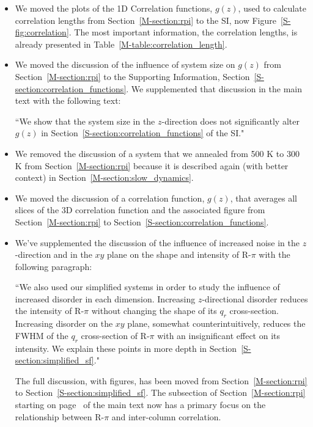 \documentclass{article}
\begin{document}
\begin{enumerate}
\begin{itemize}
    \item We moved the plots of the 1D Correlation functions, $g(z)$, used to calculate 
    correlation lengths from Section~\ref{M-section:rpi} to the SI, now Figure~\ref{S-fig:correlation}.
    The most important information, the correlation lengths, is already presented in 
    Table~\ref{M-table:correlation_length}.
    
    \item We moved the discussion of the influence of system size on $g(z)$ 
    from Section~\ref{M-section:rpi} to the Supporting Information, 
    Section~\ref{S-section:correlation_functions}. We supplemented that discussion in
    the main text with the following text:    
    
    ``We show that the system size in the $z$-direction does not significantly 
    alter $g(z)$ in Section~\ref{S-section:correlation_functions} of the SI."
    
    \item We removed the discussion of a system that we annealed from 500 K to 300 K
    from Section~\ref{M-section:rpi} because it is described again (with better context)
    in Section~\ref{M-section:slow_dynamics}.
    
	\item We moved the discussion of a correlation function, $g(z)$, that averages
	all slices of the 3D correlation function and the associated figure from 
	Section~\ref{M-section:rpi} to Section~\ref{S-section:correlation_functions}.
    
    \item We've supplemented the discussion of the influence of increased noise in the 
    $z$-direction and in the $xy$ plane on the shape and intensity of R-$\pi$ with the
    following paragraph:
    
    ``We also used our simplified systems in order to study the influence of increased
    disorder in each dimension. Increasing $z$-directional disorder reduces the
    intensity of R-$\pi$ without changing the shape of its $q_r$ cross-section.
    Increasing disorder on the $xy$ plane, somewhat counterintuitively, reduces
    the FWHM of the $q_r$ cross-section of R-$\pi$ with an insignificant effect
    on its intensity. We explain these points in more depth in 
    Section~\ref{S-section:simplified_sf}."
    
    The full discussion, with figures, has been moved from Section~\ref{M-section:rpi}
    to Section~\ref{S-section:simplified_sf}. The subsection of Section~\ref{M-section:rpi}
    starting on page~\pageref{M-section:rpi_xsection} of the main text now has a primary
    focus on the relationship between R-$\pi$ and inter-column correlation.
    

\end{itemize}
\end{enumerate}
\end{document}
